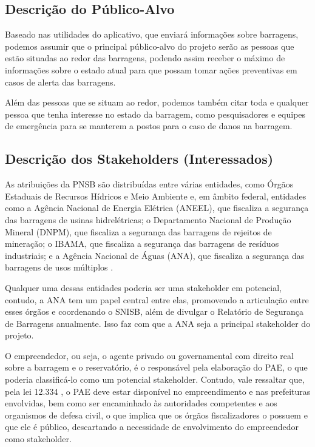 \documentclass[12pt]{article}
\begin{document}
\subsection{Descrição do Público-Alvo}

Baseado nas utilidades do aplicativo, que enviará informações sobre barragens, podemos assumir que o principal público-alvo do projeto serão as pessoas que estão situadas ao redor das barragens, podendo assim receber o máximo de informações sobre o estado atual para que possam tomar ações preventivas em casos de alerta das barragens.

Além das pessoas que se situam ao redor, podemos também citar toda e qualquer pessoa que tenha interesse no estado da barragem, como pesquisadores e equipes de emergência para se manterem a postos para o caso de danos na barragem.

\subsection{Descrição dos Stakeholders (Interessados)}

As atribuições da PNSB são distribuídas entre várias entidades, como Órgãos Estaduais de Recursos Hídricos e Meio Ambiente e, em âmbito federal, entidades como a Agência Nacional de Energia Elétrica (ANEEL), que fiscaliza a segurança das barragens de usinas hidrelétricas; o Departamento Nacional de Produção Mineral (DNPM), que fiscaliza a segurança das barragens de rejeitos de mineração; o IBAMA, que fiscaliza a segurança das barragens de resíduos industriais; e a Agência Nacional de Águas (ANA), que fiscaliza a segurança das barragens de usos múltiplos \cite{SNISB}.

Qualquer uma dessas entidades poderia ser uma stakeholder em potencial, contudo, a ANA tem um papel central entre elas, promovendo a articulação entre esses órgãos e coordenando o SNISB, além de divulgar o Relatório de Segurança de Barragens anualmente. Isso faz com que a ANA seja a principal stakeholder do projeto.

O empreendedor, ou seja, o agente privado ou governamental com direito real sobre a barragem e o reservatório, é o responsável pela elaboração do PAE, o que poderia classificá-lo como um potencial stakeholder. Contudo, vale ressaltar que, pela lei 12.334 \cite{leiPNSB}, o PAE deve estar disponível no empreendimento e nas prefeituras envolvidas, bem como ser encaminhado às autoridades competentes e aos organismos de defesa civil, o que implica que os órgãos fiscalizadores o possuem e que ele é público, descartando a necessidade de envolvimento do empreendedor como stakeholder.
\end{document}
